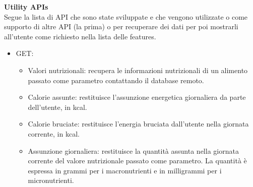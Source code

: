 \documentclass{article}
\begin{document}
   \textbf{Utility APIs}\\
   Segue la lista di API che sono state sviluppate e che vengono utilizzate o come supporto di altre API (la prima) o per recuperare dei dati per poi mostrarli all’utente come richiesto nella lista delle features.
   \begin{itemize}
      \item GET:
         \begin{itemize}
            \item Valori nutrizionali: recupera le informazioni nutrizionali di un alimento passato come parametro contattando il database remoto.
            \item Calorie assunte: restituisce l’assunzione energetica giornaliera da parte dell’utente, in kcal.
            \item Calorie bruciate: restituisce l’energia bruciata dall’utente nella giornata corrente, in kcal.
            \item Assunzione giornaliera: restituisce la quantità assunta nella giornata corrente del valore nutrizionale passato come parametro. La quantità è espressa in grammi per i macronutrienti e in milligrammi per i micronutrienti.
         \end{itemize}
   \end{itemize}
\end{document}
